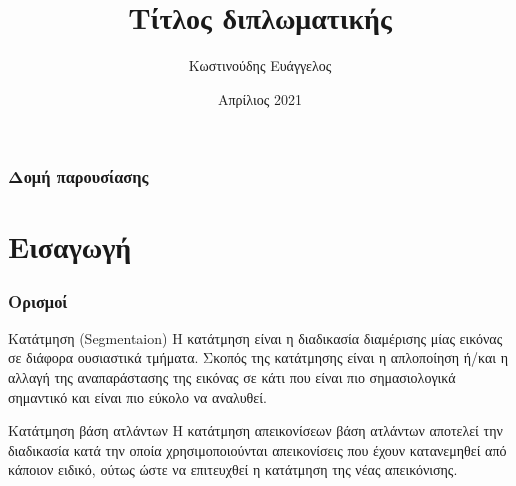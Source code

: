 \documentclass{beamer}
\title[Short title] {Τίτλος διπλωματικής}
\institute 
{
    Αριστοτέλειο Πανεπιστήμιο Θεσσαλονίκης \\
    Τμήμα Ηλεκτρολόγων Μηχανικών και Μηχανικών Υπολογιστών \\
    Τομέας Ηλεκτρονικής και Υπολογιστών
}
\author {Κωστινούδης Ευάγγελος}
\date{Απρίλιος 2021}
\begin{document}
\begin{frame}

\maketitle


\end{frame}

\begin{frame}
\frametitle{Δομή παρουσίασης}
\tableofcontents[hideallsubsections]
\end{frame}

\section{Εισαγωγή}

\begin{frame}
\frametitle{Ορισμοί}
\begin{block}{Κατάτμηση (Segmentaion)}
Η κατάτμηση είναι η διαδικασία διαμέρισης μίας εικόνας σε διάφορα ουσιαστικά
τμήματα. Σκοπός της κατάτμησης είναι η απλοποίηση ή/και η αλλαγή της
αναπαράστασης της εικόνας σε κάτι που είναι πιο σημασιολογικά σημαντικό και
είναι πιο εύκολο να αναλυθεί.
\end{block} \pause

\begin{block}{Κατάτμηση βάση ατλάντων}
Η κατάτμηση απεικονίσεων βάση ατλάντων αποτελεί την διαδικασία κατά την οποία
χρησιμοποιούνται απεικονίσεις που έχουν κατανεμηθεί από κάποιον ειδικό, ούτως
ώστε να επιτευχθεί η κατάτμηση της νέας απεικόνισης.
\end{block} 
\end{frame}
\end{document}
